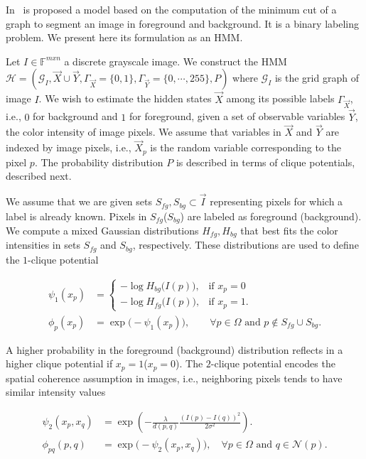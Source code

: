 In~\cite{boykov01graphcut} is proposed a model based on the computation of the minimum cut of a graph to segment an image in foreground and background. It is a binary labeling problem. We present here its formulation as an HMM.

Let $I \in \mathbb{F}^{mxn}$ a discrete grayscale image. We construct the HMM $\mathcal{H} = (\mathcal{G}_I,\vec{X} \cup \vec{Y},\Gamma_{\vec{X}}=\{0,1\}, \Gamma_{\vec{Y}}=\{0,\cdots,255\},P)$ where $\mathcal{G}_I$ is the grid graph of image $I$. We wish to estimate the hidden states $\vec{X}$ among its possible labels $\Gamma_{\vec{X}}$, i.e., $0$ for background and $1$ for foreground, given a set of observable variables $\vec{Y}$, the color intensity of image pixels. We assume that variables in $\vec{X}$ and $\vec{Y}$ are indexed by image pixels, i.e., $\vec{X}_p$ is the random variable corresponding to the pixel $p$. The probability distribution $P$ is described in terms of clique potentials, described next.  

We assume that we are given sets $S_{fg},S_{bg} \subset \vec{I}$ representing pixels for which a label is already known. Pixels in $S_{fg}$($S_{bg}$) are labeled as foreground (background). We compute a mixed Gaussian distributions $H_{fg},H_{bg}$ that best fits the color intensities in sets $S_{fg}$ and $S_{bg}$, respectively. These distributions are used to define the $1$-clique potential

\begin{align*}
	\psi_1(x_p) &= \left\{ \begin{array}{ll}
	-\log  H_{bg}\big( I(p) \big), & \text{if } x_p=0  \\[1em]	
	-\log  H_{fg}\big( I(p) \big), & \text{if } x_p=1 .
	\end{array}\right.\\[1em]
	\phi_p(x_p) &= \exp{ \big(- \psi_1(x_p) \big) },\quad \quad \forall p \in \Omega \text{ and } p \notin S_{fg} \cup S_{bg}.
\end{align*}

A higher probability in the foreground (background) distribution reflects in a higher clique potential if $x_p=1$($x_p=0$). The $2$-clique potential encodes the spatial coherence assumption in images, i.e., neighboring pixels tends to have similar intensity values

\begin{align*}
	\psi_{2}(x_p,x_q) &= \exp{ \left( - \frac{\lambda}{d(p,q)}\frac{(I(p) - I(q))^2}{2\sigma^2} \right) }.\\[1em]
	\phi_{pq}(p,q) &= \exp{ \big( -\psi_{2}(x_p,x_q) \big) }, \quad \forall p \in \Omega \text{ and } q \in \mathcal{N}(p).
\end{align*}

